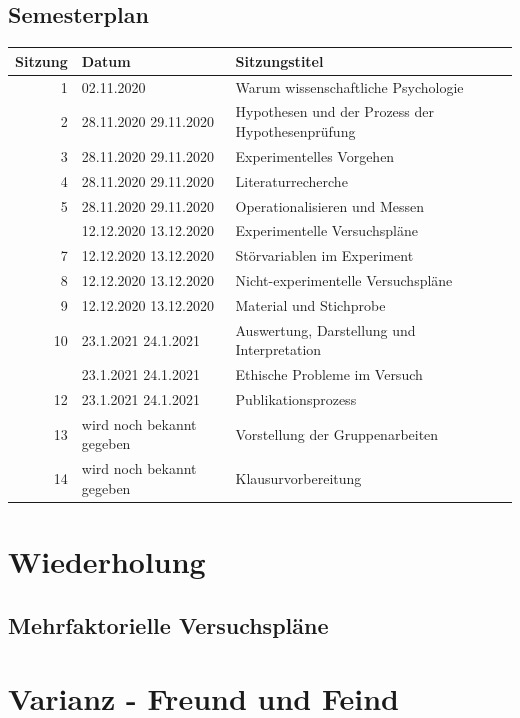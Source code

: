 \documentclass[
]{book}
\begin{document}
\hypertarget{semesterplan-7}{%
\subsection{Semesterplan}\label{semesterplan-7}}

\begin{tabular}[t]{rll}
\toprule
Sitzung & Datum & Sitzungstitel\\
\midrule
1 & 02.11.2020 & Warum wissenschaftliche Psychologie\\
2 & 28.11.2020
29.11.2020 & Hypothesen und der Prozess der Hypothesenprüfung\\
3 & 28.11.2020
29.11.2020 & Experimentelles Vorgehen\\
4 & 28.11.2020
29.11.2020 & Literaturrecherche\\
5 & 28.11.2020
29.11.2020 & Operationalisieren und Messen\\
\addlinespace
6 & 12.12.2020
13.12.2020 & Experimentelle Versuchspläne\\
7 & 12.12.2020
13.12.2020 & Störvariablen im Experiment\\
8 & 12.12.2020
13.12.2020 & Nicht-experimentelle Versuchspläne\\
9 & 12.12.2020
13.12.2020 & Material und Stichprobe\\
10 & 23.1.2021
24.1.2021 & Auswertung, Darstellung und Interpretation\\
\addlinespace
11 & 23.1.2021
24.1.2021 & Ethische Probleme im Versuch\\
12 & 23.1.2021
24.1.2021 & Publikationsprozess\\
13 & wird noch bekannt gegeben & Vorstellung der Gruppenarbeiten\\
14 & wird noch bekannt gegeben & Klausurvorbereitung\\
\bottomrule
\end{tabular}

\hypertarget{wiederholung-5}{%
\section{Wiederholung}\label{wiederholung-5}}

\hypertarget{mehrfaktorielle-versuchspluxe4ne-1}{%
\subsection{Mehrfaktorielle Versuchspläne}\label{mehrfaktorielle-versuchspluxe4ne-1}}

\hypertarget{varianz---freund-und-feind}{%
\section{Varianz - Freund und Feind}\label{varianz---freund-und-feind}}
\end{document}
